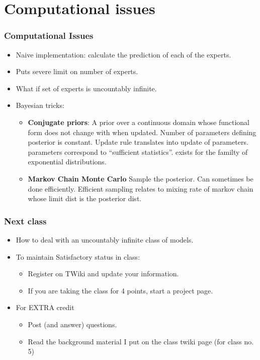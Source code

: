 \documentclass[handout]{beamer}
\newcommand{\R}[1]{{\color{red}{#1}}}
\begin{document}

\section{Computational issues}

\begin{frame}
\frametitle{Computational Issues}
\begin{itemize}
\item Naive implementation: calculate the prediction of each of 
the \R{$N$} experts.
\item Puts severe limit on number of experts.
\item What if set of experts is uncountably infinite.
\item Bayesian tricks:
\begin{itemize}
\item {\bf Conjugate priors}: A prior over a continuous domain whose functional form does not change with when updated. 
\pause Number of parameters defining posterior is constant. 
\pause Update rule translates into update of parameters.
\pause parameters correspond to ``sufficient statistics''.
\pause exists for the familty of exponential distributions.
\item {\bf Markov Chain Monte Carlo} Sample the posterior. 
\pause Can sometimes be done efficiently.
\pause Efficient sampling relates to mixing rate of markov chain whose limit dist is the posterior dist. 
\end{itemize}
\end{itemize}
\end{frame}

\begin{frame}
\frametitle{Next class}
\begin{itemize}
\item How to deal with an uncountably infinite class of models.
\item To maintain {\color{red} S}atisfactory status in class:
\begin{itemize}
\item Register on TWiki and update your information.
\item If you are taking the class for 4 points, start a project page.
\end{itemize}
\item For {\color{red} EXTRA} credit
\begin{itemize}
\item Post (and answer) questions.
\item Read the background material I put on the class twiki page (for
  class no. 5)
\end{itemize}
\end{itemize}
\end{frame}

\iffalse %
\begin{frame}
\frametitle{XXX}
\begin{itemize}
\item XXX
\end{itemize}
\end{frame}

\fi %
\end{document}
